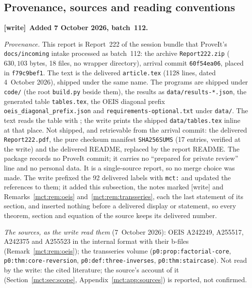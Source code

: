 \documentclass[11pt]{article}
\theoremstyle{definition}
\newcommand{\file}[1]{\nolinkurl{#1}}
\newenvironment{writenote}[1][]{\par\smallskip\begingroup\small
 \noindent\textbf{[write]}\if\relax\detokenize{#1}\relax\else~\textbf{#1.}\fi\ }%
 {\par\endgroup\smallskip}
\begin{document}
\subsection{Provenance, sources and reading conventions}\label{mct:sec:provenance}
\begin{writenote}[Added 7 October 2026, batch~112]\raggedright
\emph{Provenance.} This report is Report~222 of the session bundle that
ProveIt's \file{docs/incoming} intake processed as batch~112: the archive
\file{Report222.zip} ($630{,}103$ bytes, 18 files, no wrapper directory),
arrival commit \file{60f54ea06}, placed in \file{f79c9bef1}. The text is the
delivered \file{article.tex} (1128 lines, dated 4~October 2026), shipped
under the same name. The programs are shipped under \file{code/} (the root
\file{build.py} beside them), the results as \file{data/results-*.json}, the
generated table \file{tables.tex}, the OEIS diagonal prefix
\file{oeis_diagonal_prefix.json} and \file{requirements-optional.txt} under
\file{data/}. The text reads the table with \verb||; the
write prints the shipped \file{data/tables.tex} inline at that place. Not
shipped, and retrievable from the arrival commit: the delivered
\file{Report222.pdf}, the pure checksum manifest \file{SHA256SUMS} (17
entries, verified at the write) and the delivered README, replaced by the
report README. The package records no ProveIt commit; it carries no
``prepared for private review'' line and no personal data. It is a
single-source report, so no merge choice was made. The write prefixed the 92
delivered labels with \file{mct:} and updated the references to them; it
added this subsection, the notes marked [write] and
Remarks~\ref{mct:rem:oeis} and~\ref{mct:rem:transseries}, each the last
statement of its section, and inserted nothing before a delivered display or
statement, so every theorem, section and equation of the source keeps its
delivered number.

\emph{The sources, as the write read them} (7~October 2026): OEIS A242249,
A255517, A242375 and A255523 in the internal format with their b-files
(Remark~\ref{mct:rem:oeis}); the transseries volume
(\file{p0:prop:factorial-core}, \file{p0:thm:core-reversion},
\file{p0:def:three-inverses}, \file{p0:thm:staircase}). Not read by the
write: the cited literature; the source's account of it
(Section~\ref{mct:sec:scope}, Appendix~\ref{mct:app:sources}) is reported,
not confirmed.


\end{writenote}
\end{document}
